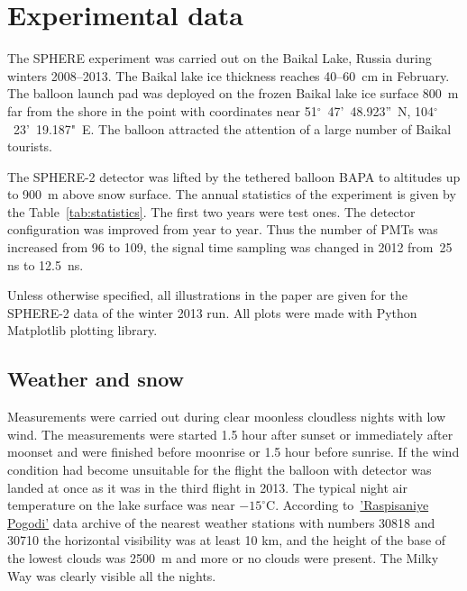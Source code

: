 \documentclass[final,5p,times,twocolumn]{elsarticle}
\begin{document}
\section{Experimental data}
\label{sect:data}
 
The SPHERE experiment was carried out on the Baikal Lake, Russia during winters 2008--2013. The Baikal lake ice thickness reaches 40--60~cm in February. The balloon launch pad was deployed on the frozen Baikal lake ice surface 800~m far from the shore in the point with coordinates near 51$^\circ$~47'~48.923''~N, 104$^\circ$~23'~19.187"~E. 
The balloon attracted the attention of a large number of Baikal tourists. 

The \mbox{SPHERE-2} detector was lifted by the tethered balloon BAPA to altitudes up to 900~m above snow surface. The annual statistics of the experiment is given by the Table~\ref{tab:statistics}. The first two years were test ones. The detector configuration was improved from year to year. Thus the number of PMTs was increased from 96 to 109, the signal time sampling was changed in 2012 from~25 ns to 12.5~ns.

Unless otherwise specified, all illustrations in the paper are given for the \mbox{SPHERE-2} data of the winter 2013 run. All plots were made with Python Matplotlib plotting library.


\subsection{Weather and snow}

Measurements were carried out during clear moonless cloudless nights with low wind. The measurements were started 1.5 hour after sunset or immediately after moonset and were finished before moonrise or 1.5 hour before sunrise. If the wind condition had become unsuitable for the flight the balloon with detector was landed at once as it was in the third flight in 2013. The typical night air temperature on the lake surface was near $-15^\circ$C. According to~\href{https://rp5.ru/}{'Raspisaniye Pogodi'} data archive of the nearest weather stations with numbers 30818 and 30710 the horizontal visibility was at least 10 km, and the height of the base of the lowest clouds was 2500~m and more or no clouds were present. The Milky Way was clearly visible all the nights.
\end{document}
